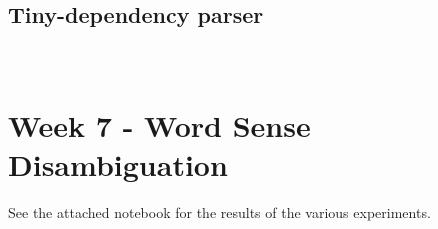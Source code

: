 \documentclass[a4paper, 11pt]{article}
\begin{document}
\subsection{Tiny-dependency parser}

\noindent{}\\

\section{Week 7 - Word Sense Disambiguation}

See the attached notebook for the results of the various experiments.
\end{document}
